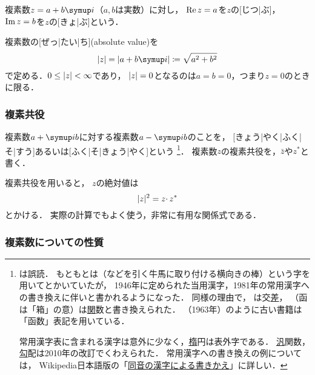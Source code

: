 \documentclass[../sotsu.tex]{subfiles}
\begin{document}
複素数$z = a + b\iu$（$a, b$は実数）に対し，
$\operatorname{Re} z = a$を$z$の[じつ|ぶ]，
$\operatorname{Im} z = b$を$z$の[きょ|ぶ]という．

複素数の[ぜっ|たい|ち](absolute value)を
\begin{equation}
    \label{eq:complex-number-abs}
    \abs{z} 
        = \abs{a + b\iu}
        \coloneq \sqrt{a^2 + b^2}
\end{equation}
で定める．$0 \leq \lvert z\rvert < \infty$であり，
$\lvert z\rvert = 0$となるのは$a = b = 0$，つまり$z = 0$のときに限る．



\subsubsection*{複素共役}

複素数$a + \iu b$に対する複素数$a - \iu b$のことを，
[きょう|やく|ふく|そ|すう]あるいは[ふく|そ|きょう|やく]という%
\footnote{\label{footnote:joyo-kanji}
    は誤読．
    もともとは（などを引く牛馬に取り付ける横向きの棒）という字を用いてとかいていたが，
    1946年に定められた当用漢字，1981年の常用漢字への書き換えに伴いと書かれるようになった．
    同様の理由で，
    は交\underline{差}，
    （函は「箱」の意）は\underline{関}数と書き換えられた．
    \cite{ito-lebesgue-1963}（1963年）のように古い書籍は「函数」表記を用いている．
    
    常用漢字表に含まれる漢字は意外に少なく，\underline{楕}円は表外字である．
    \underline{汎}関数，\underline{勾}配は2010年の改訂でくわえられた．
    常用漢字への書き換えの例については，
    Wikipedia日本語版の「\href{https://ja.wikipedia.org/wiki/同音の漢字による書きかえ}{同音の漢字による書きかえ}」に詳しい．
}．
複素数$z$の複素共役を，$\bar{z}$や$z^*$と書く．

複素共役を用いると，
$z$の絶対値は
\begin{equation}
    \abs{z}^2 = z \cdotp \conj{z}
\end{equation}
とかける．
実際の計算でもよく使う，非常に有用な関係式である．




\subsubsection*{複素数についての性質}
\end{document}
